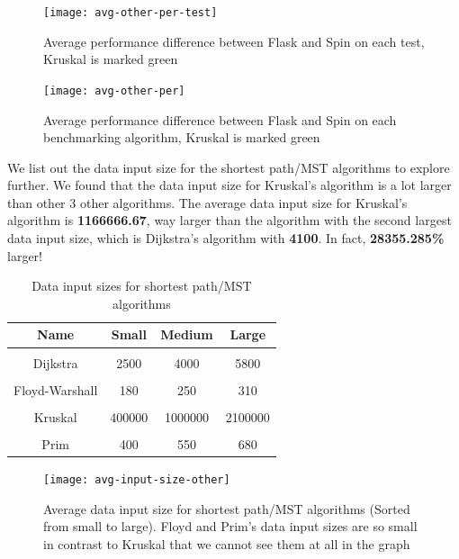 \newpage
\begin{figure}[hp]
\centering
\texttt{[image: avg-other-per-test]}
\caption{\footnotesize{Average performance difference between Flask and Spin on each test, Kruskal is marked green}}
\captionsetup{aboveskip=0pt,font=it}
\end{figure}

\bigskip
\begin{figure}[hp]
\centering
\texttt{[image: avg-other-per]}
\caption{\footnotesize{Average performance difference between Flask and Spin on each benchmarking algorithm, Kruskal is marked green}}
\captionsetup{aboveskip=0pt,font=it}
\end{figure}
\bigskip

We list out the data input size for the shortest path/MST algorithms to explore further. We found that the data input size for Kruskal's algorithm is a lot larger than other 3 other algorithms. The average data input size for Kruskal's algorithm is \textbf{1166666.67}, way larger than the algorithm with the second largest data input size, which is Dijkstra's algorithm with \textbf{4100}. In fact, \textbf{28355.285\%} larger!

\bigskip
\begin{table}[h!]
\centering
\begin{tabular}{||c c c c||} 
\hline
Name & Small & Medium & Large \\ [1ex] 
\hline\hline
 & & & \\
Dijkstra & 2500 & 4000 & 5800 \\ 
 & & & \\
Floyd-Warshall & 180 & 250 & 310 \\ 
 & & & \\
Kruskal & 400000 & 1000000 & 2100000 \\ 
 & & & \\
Prim & 400 & 550 & 680 \\ [1ex]
\hline
\end{tabular}
\caption{Data input sizes for shortest path/MST algorithms}
\label{table:time_complexity_1}
\end{table}
\bigskip

\newpage
\bigskip
\begin{figure}[hp]
\centering
\texttt{[image: avg-input-size-other]}
\caption{\footnotesize{Average data input size for shortest path/MST algorithms (Sorted from small to large). Floyd and Prim's data input sizes are so small in contrast to Kruskal that we cannot see them at all in the graph}}
\captionsetup{aboveskip=0pt,font=it}
\end{figure}
\bigskip

